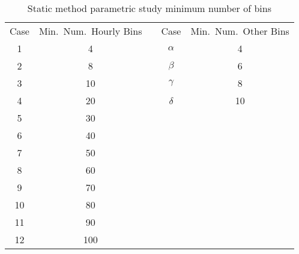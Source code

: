\documentclass[review,12pt]{elsarticle}
\begin{document}
\begin{table}[htbp!]
\centering
\caption{Static method parametric study minimum number of bins}
\label{tab:staic case nums}
\begin{tabular}{|c|c|ccc}
\cline{1-2} \cline{4-5}
Case & Min.~Num.~Hourly Bins & \multicolumn{1}{c|}{} & \multicolumn{1}{c|}{Case}                  & \multicolumn{1}{c|}{Min.~Num.~Other Bins} \\ \cline{1-2} \cline{4-5} 
1    & 4                     & \multicolumn{1}{c|}{} & \multicolumn{1}{c|}{$\alpha$} & \multicolumn{1}{c|}{4}                    \\ \cline{1-2} \cline{4-5} 
2    & 8                     & \multicolumn{1}{c|}{} & \multicolumn{1}{c|}{$\beta$}  & \multicolumn{1}{c|}{6}                    \\ \cline{1-2} \cline{4-5} 
3    & 10                    & \multicolumn{1}{c|}{} & \multicolumn{1}{c|}{$\gamma$} & \multicolumn{1}{c|}{8}                    \\ \cline{1-2} \cline{4-5} 
4    & 20                    & \multicolumn{1}{c|}{} & \multicolumn{1}{c|}{$\delta$} & \multicolumn{1}{c|}{10}                   \\ \cline{1-2} \cline{4-5} 
5    & 30                    &                       &                                            &                                           \\ \cline{1-2}
6    & 40                    &                       &                                            &                                           \\ \cline{1-2}
7    & 50                    &                       &                                            &                                           \\ \cline{1-2}
8    & 60                    &                       &                                            &                                           \\ \cline{1-2}
9    & 70                    &                       &                                            &                                           \\ \cline{1-2}
10   & 80                    &                       &                                            &                                           \\ \cline{1-2}
11   & 90                    &                       &                                            &                                           \\ \cline{1-2}
12   & 100                   &                       &                                            &                                           \\ \cline{1-2}
\end{tabular}
\end{table}
\end{document}
